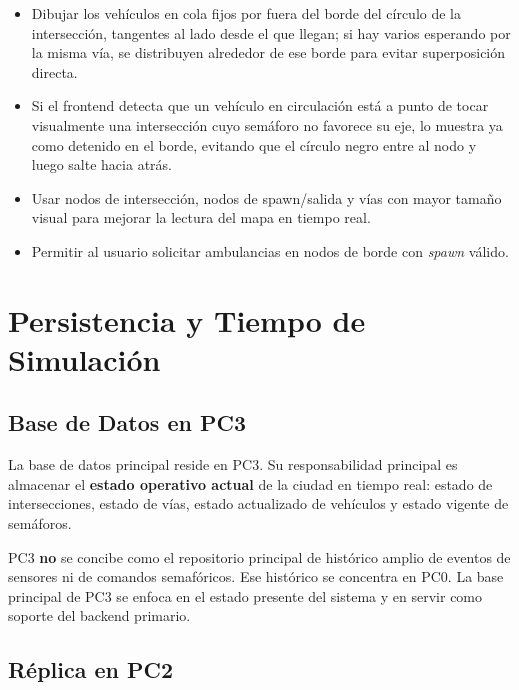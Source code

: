 \documentclass[12pt, a4paper]{article}
\begin{document}
\begin{itemize}
    \item Dibujar los vehículos en cola fijos por fuera del borde del círculo de la intersección, tangentes al lado desde el que llegan; si hay varios esperando por la misma vía, se distribuyen alrededor de ese borde para evitar superposición directa.
    \item Si el frontend detecta que un vehículo en circulación está a punto de tocar visualmente una intersección cuyo semáforo no favorece su eje, lo muestra ya como detenido en el borde, evitando que el círculo negro entre al nodo y luego salte hacia atrás.
    \item Usar nodos de intersección, nodos de spawn/salida y vías con mayor tamaño visual para mejorar la lectura del mapa en tiempo real.
    \item Permitir al usuario solicitar ambulancias en nodos de borde con \textit{spawn} válido.
\end{itemize}

\section{Persistencia y Tiempo de Simulación}

\subsection{Base de Datos en PC3}

La base de datos principal reside en PC3. Su responsabilidad principal es almacenar el \textbf{estado operativo actual} de la ciudad en tiempo real: estado de intersecciones, estado de vías, estado actualizado de vehículos y estado vigente de semáforos.

PC3 \textbf{no} se concibe como el repositorio principal de histórico amplio de eventos de sensores ni de comandos semafóricos. Ese histórico se concentra en PC0. La base principal de PC3 se enfoca en el estado presente del sistema y en servir como soporte del backend primario.

\subsection{Réplica en PC2}
\end{document}
